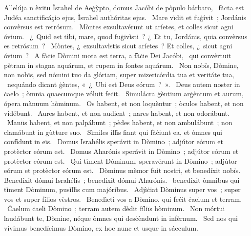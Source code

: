 { Allelúja}
{%
n èxitu Ìsrahel de Aeġỳpto, domus Jacóbi de pòpulo bárbaro, 
~fàcta est Judéa sanctificáçio ejus, Ìsrahel authóritas ejus. 
~Mare vïdit et fuġívit~; Jordánis convèrsus est retrósum. 
~Mòntes exsultavérunt ut aríetes, et colles sicut agni óvium. 
~¿~Quid est tìbi, mare, quod fuġivìsti~? ¿~Et tu, Jordánis, quia convèrsus es retrósum~? 
~Mòntes, ¿~exsultavìstis sicut aríetes~? Et colles, ¿~sicut agni óvium~? 
~A fàċie Dòmini mota est terra, a fàċie Dei Jacóbi, 
~qui convèrtuit pètram in stagna aquárum, et rupem in fontes aquárum. 
~Non nobïs, Dòmine, non nobïs, sed nómini tuo da glóriam, super mizericórdia tua et veritáte tua, 
~nequándo dicant ġèntes, «~¿~Ubi est Deus eórum~?~». 
~Deus autem noster in ċaelo~; òmnia quaecumque vóluit feċit. 
~Simulácra ġèntium arġèntum et aurum, ópera mànuum hòminum. 
~Os habent, et non loquèntur~; òculos habent, et non vidébunt. 
~Aures habent, et non audient~; nares habent, et non odorábunt. 
~Manüs habent, et non palpábunt~; pèdes habent, et non ambulábunt~; non clamábunt in gùtture suo. 
~Sìmiles illïs fiant qui fàċiunt ea, et òmnes qui confídunt in eïs. 
~Domus Israhélis sperávit in Dòmino~; adjútor eórum et protèctor eórum est. 
~Domus Aharónis sperávit in Dòmino~; adjútor eórum et protèctor eórum est. 
~Qui tìment Dòminum, speravérunt in Dòmino~; adjútor eórum et protèctor eórum est. 
~Dòminus mèmor fuit nostri, et benedíxit nobïs. Benedíxit dómui Israhélis~; benedíxit dómui Aharónis. 
~benedíxit òmnibus qui tìment Dòminum, pusìllïs cum majóribus. 
~Adjìċiat Dòminus super vos~; super vos et super fílios vèstros. 
~Benedìcti vos a Dòmino, qui feċit ċaelum et terram. 
~Ċaelum ċaeli Dòmino~; terram autem dèdit fíliïs hòminum. 
~Non mórtui laudábunt te, Dòmine, néque òmnes qui desċèndunt in infèrnum. 
~Sed nos qui vívimus benedícimus Dòmino, ex hoc nunc et usque in sáeculum. 
}
